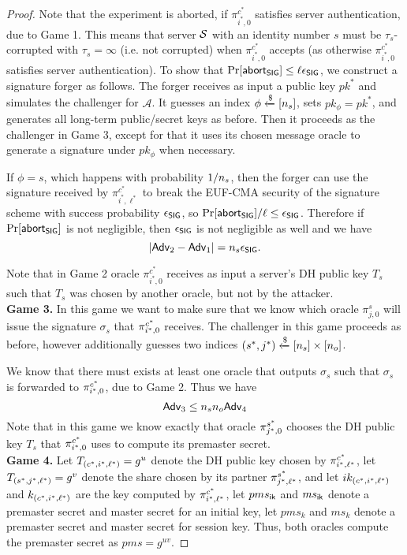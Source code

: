 \begin{proof}
 Note that the experiment is aborted, if $\pi^{c^{\ast}}_{i^{\ast},0}$ satisfies server authentication, due to Game 1. This means that server $\mathcal{S}$ with an identity number $s$ must be $\tau_s$-corrupted with $\tau_s = \infty$ (i.e. not corrupted) when $\pi^{c^{\ast}}_{i^{\ast},0}$ accepts (as otherwise $\pi^{c^{\ast}}_{i^{\ast},0}$ satisfies server authentication). To show that $\Pr[\mathsf{abort}_{\mathsf{SIG}}] \leq \ell \epsilon_{\mathsf{SIG}}$, we construct a signature forger as follows. The forger receives as input a public key $pk^{\ast}$ and simulates the challenger for $\mathcal{A}$. It guesses an index $\phi \xleftarrow{\$}[n_s]$, sets $pk_{\phi} = pk^{\ast}$, and generates all long-term public/secret keys as before. Then it proceeds as the challenger in Game 3, except for that it uses its chosen message oracle to generate a signature under $pk_{\phi}$ when necessary.

 If $\phi = s$, which happens with probability $1/n_s$, then the forger can use the signature received by $\pi^{c^{\ast}}_{i^{\ast},\ell^{\ast}}$ to break the EUF-CMA security of the signature scheme with success probability $\epsilon_{\mathsf{SIG}}$, so $\Pr[\mathsf{abort}_{\mathsf{SIG}}]/\ell \leq \epsilon_{\mathsf{SIG}}$. Therefore if $\Pr[\mathsf{abort}_{\mathsf{SIG}}]$ is not negligible, then $\epsilon_{\mathsf{SIG}}$ is not negligible as well and we have
 \begin{equation}
  |\mathsf{Adv}_2 - \mathsf{Adv}_1| = n_s \epsilon_{\mathsf{SIG}}.
 \end{equation}%

 Note that in Game 2 oracle $\pi^{c^{\ast}}_{i^{\ast},0}$ receives as input a server's DH public key $T_s$ such that $T_s$ was chosen by another oracle, but not by the attacker.
\vspace{10pt}\\%
%
%
 \textbf{Game 3.} In this game we want to make sure that we know which oracle $\pi^s_{j,0}$ will issue the signature $\sigma_s$ that $\pi^{c^{\ast}}_{i^{\ast},0}$ receives. The challenger in this game proceeds as before, however additionally guesses two indices $(s^{\ast}, j^{\ast}) \xleftarrow{\$} [n_s] \times [n_o]$.

 We know that there must exists at least one oracle that outputs $\sigma_s$ such that $\sigma_s$ is forwarded to $\pi^{c^{\ast}}_{i^{\ast},0}$, due to Game 2. Thus we have
 \begin{equation}
  \mathsf{Adv}_3 \leq n_s n_o \mathsf{Adv}_4
 \end{equation}%
 Note that in this game we know exactly that oracle $\pi^{s^{\ast}}_{j^{\ast},0}$ chooses the DH public key $T_s$ that $\pi^{c^{\ast}}_{i^{\ast},0}$ uses to compute its premaster secret.
 \vspace{10pt}\\
%
%
 \textbf{Game 4.} Let $T_{(c^{\ast}, {i^{\ast}, \ell^{\ast})}} = g^u$ denote the DH public key chosen by $\pi^{c^{\ast}}_{i^{\ast},\ell^{\ast}}$, let $T_{(s^{\ast}, {j^{\ast}, \ell^{\ast})}} = g^v$ denote the share chosen by its partner $\pi^{s^{\ast}}_{j^{\ast},\ell^{\ast}}$, and let $ik_{(c^{\ast}, {i^{\ast}, \ell^{\ast})}}$ and $k_{(c^{\ast}, {i^{\ast}, \ell^{\ast})}}$ are the key computed by $\pi^{c^{\ast}}_{i^{\ast},\ell^{\ast}}$, let $pms_{\mathsf{ik}}$ and $ms_{\mathsf{ik}}$ denote a premaster secret and master secret for an initial key, let $pms_{k}$ and $ms_{k}$ denote a premaster secret and master secret for session key. Thus, both oracles compute the premaster secret as $pms = g^{uv}$.


\end{proof}
